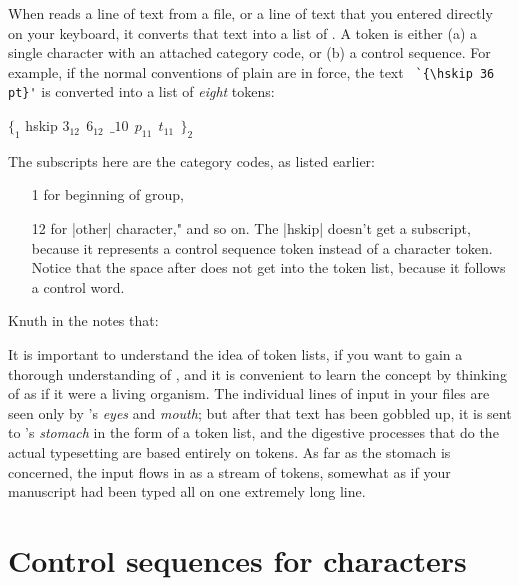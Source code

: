 When \tex reads a line of text from a file, or a line of text that you entered
directly on your keyboard, it converts that text into a list of . A
token is either (a) a single character with an attached category code, or (b) a control
sequence. For example, if the normal conventions of plain \tex  are in force, the text
\verb*+ `{\hskip 36 pt}'+  is converted into a list of \textit{eight} tokens:
\medskip

$ \{_{1}$ hskip $3_{12}~~6_{12}~~\_{10}~~p_{11}~~t_{11}~~\}_2 $

\medskip
The subscripts here are the category codes, as listed earlier:
\begin{itemize}
\item[1] for beginning of group,
\item[12] for |other| character," and so on. The |hskip| doesn't get a subscript, because it
represents a control sequence token instead of a character token. Notice that the space
after  does not get into the token list, because it follows a control word.
\end{itemize}

Knuth in the \texbook notes that:

\begin{latexquotation}

It is important to understand the idea of token lists, if you want to gain a
thorough understanding of \tex, and it is convenient to learn the concept by
thinking of \tex as if it were a living organism. The individual lines of input in your
files are seen only by \tex's \textit{eyes} and \textit{mouth}; but after that text has been gobbled
up, it is sent to \tex's \textit{stomach} in the form of a token list, and the digestive processes
that do the actual typesetting are based entirely on tokens. As far as the stomach is
concerned, the input 
flows in as a stream of tokens, somewhat as if your \tex manuscript
had been typed all on one extremely long line.
\end{latexquotation}

\section{Control sequences for characters}

